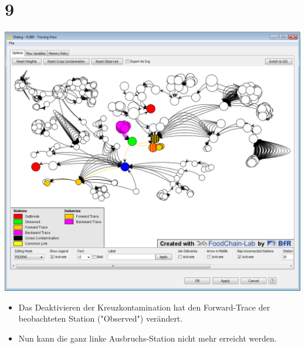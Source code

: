 \documentclass{beamer}
\begin{document}
\section{9}
\begin{frame}
	\begin{center}
  		\includegraphics[height=0.6\textheight]{9.png}
	\end{center}
	\begin{itemize}
		\item Das Deaktivieren der Kreuzkontamination hat den Forward-Trace der beobachteten Station ("Observed") verändert.
		\item Nun kann die ganz linke Ausbruchs-Station nicht mehr erreicht werden.
	\end{itemize}
\end{frame}
\end{document}
